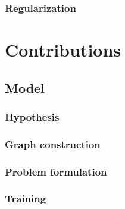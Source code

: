 \documentclass[a4paper,12pt,twoside]{report}
\begin{document}
\section{Regularization} \label{graph_regularization}

\part{Contributions} \label{contributions}

\chapter{Model}

\section{Hypothesis}




\section{Graph construction}

\section{Problem formulation}

\section{Training}
\end{document}

